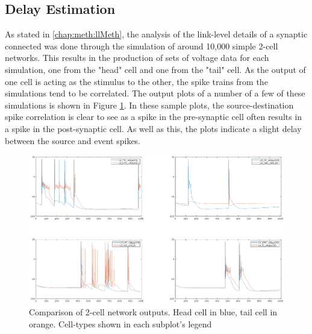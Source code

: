 \subsection{Delay Estimation}
As stated in \ref{chap:meth:llMeth}, the analysis of the link-level details of a synaptic connected was done through the simulation of around 10,000 simple 2-cell networks. This results in the production of sets of voltage data for each simulation, one from the "head" cell and one from the "tail" cell. As the output of one cell is acting as the stimulus to the other, the spike trains from the simulations tend to be correlated. The output plots of a number of a few of these simulations is shown in Figure \ref{fig:sample2CellPlots}. In these sample plots, the source-destination spike correlation is clear to see as a spike in the pre-synaptic cell often results in a spike in the post-synaptic cell. As well as this, the plots indicate a slight delay between the source and event spikes.
\begin{figure}[ht]
    \centering
    \includegraphics[width=\textwidth]{05-Results/2cellComp.png}
    \caption{Comparison of 2-cell network outputs. Head cell in blue, tail cell in orange. Cell-types shown in each subplot's legend}
    \label{fig:sample2CellPlots}
\end{figure}

\par

